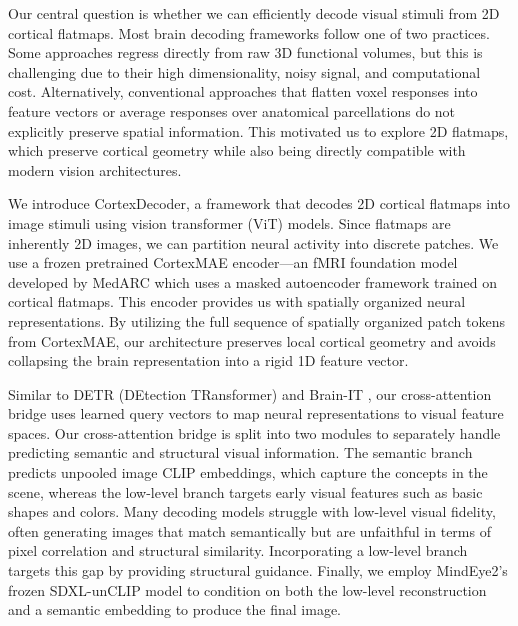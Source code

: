 \documentclass[letterpaper]{article} %
\begin{document}
Our central question is whether we can efficiently decode visual stimuli from 2D cortical flatmaps. Most brain decoding frameworks follow one of two practices. Some approaches regress directly from raw 3D functional volumes, but this is challenging due to their high dimensionality, noisy signal, and computational cost. Alternatively, conventional approaches that flatten voxel responses into feature vectors or average responses over anatomical parcellations do not explicitly preserve spatial information. This motivated us to explore 2D flatmaps, which preserve cortical geometry while also being directly compatible with modern vision architectures.



We introduce CortexDecoder, a framework that decodes 2D cortical flatmaps into image stimuli using vision transformer (ViT) \cite{dosovitskiy2021imageworth16x16words} models. Since flatmaps are inherently 2D images, we can partition neural activity into discrete patches. We use a frozen pretrained CortexMAE \cite{lane2026scalingvisiontransformersfunctional} encoder---an fMRI foundation model developed by MedARC which uses a masked autoencoder framework trained on cortical flatmaps. This encoder provides us with spatially organized neural representations. By utilizing the full sequence of spatially organized patch tokens from CortexMAE, our architecture preserves local cortical geometry and avoids collapsing the brain representation into a rigid 1D feature vector.

Similar to DETR (DEtection TRansformer) \cite{DBLP:journals/corr/abs-2005-12872} and Brain-IT \cite{beliy2025brainitimagereconstructionfmri}, our cross-attention bridge uses learned query vectors to map neural representations to visual feature spaces. Our cross-attention bridge is split into two modules to separately handle predicting semantic and structural visual information. The semantic branch predicts unpooled image CLIP \cite{radford2021learningtransferablevisualmodels} embeddings, which capture the concepts in the scene, whereas the low-level branch targets early visual features such as basic shapes and colors. Many decoding models struggle with low-level visual fidelity, often generating images that match semantically but are unfaithful in terms of pixel correlation and structural similarity. Incorporating a low-level branch targets this gap by providing structural guidance. Finally, we employ MindEye2's \cite{scotti2024mindeye2sharedsubjectmodelsenable} frozen SDXL-unCLIP model \cite{podell2023sdxlimprovinglatentdiffusion} to condition on both the low-level reconstruction and a semantic embedding to produce the final image.
\end{document}
